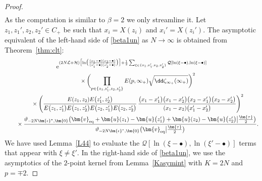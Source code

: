 \documentclass[pdftex]{sigma}
\numberwithin{equation}{section}
\begin{document}
\begin{proof}
\begin{gather}
 \end{gather}
 As the computation is similar to $\beta = 2$ we only streamline it. Let $z_1,z_1',z_2,z_2' \in C_+$ be such that $x_i = X(z_i)$ and $x_i' = X(z_i')$. The asymptotic equivalent
 of the left-hand side of \eqref{beta1un} as $N \rightarrow \infty$ is obtained from Theorem~\ref{thm:clt}:
\begin{gather}
	{\rm e}^{(2N\mathcal{L} + \mathcal{H})\bigl[\ln\bigl(\frac{(x_1- \bullet)(x_2- \bullet)}{(x_1'- \bullet)(x_2'- \bullet)}\bigr)\bigr] + \frac{1}{2}\sum_{\xi \in \{x_1,x_1',x_2,x_2'\}} \mathcal{Q}[\ln(\xi - \bullet),\ln(\xi - \bullet)]} \nonumber\\
\qquad{}	 \times \biggl(\prod_{p \in \{z_1,z'_1,z_2,z_2'\}} E(p,\infty_+)\sqrt{\dd \zeta_{\infty_+}(\infty_+)}\biggr)^2 \nonumber \\
\qquad{}	 \times \Biggl(\frac{E(z_1,z_2)E\bigl(z'_1,z_2'\bigr)}{E\bigl(z_1,z_1'\bigr)E\bigl(z_1,z_2'\bigr)E\bigl(z_2,z'_1\bigr)E\bigl(z_2,z_2'\bigr)}\,\frac{\bigl(x_1 - x_1'\bigr)\bigl(x_1 - x_2'\bigr)\bigl(x_2 - x_1'\bigr)\bigl(x_2 - x_2'\bigr)}{(x_1 - x_2)\bigl(x_1' - x_2'\bigr)}\Biggr)^2 \nonumber\\
\qquad{}	 \times \frac{\vartheta_{-2N\bm{\epsilon}^*,\bm{0}}\bigl(\bm{v}_{{\rm eq}} + \bm{u}(z_1) - \bm{u}\bigl(z'_1\bigr) + \bm{u}(z_2) - \bm{u}\bigl(z'_2\bigr)\big|\frac{\bm{\tau}}{2}\bigr)}{\vartheta_{-2N\bm{\epsilon}^*,\bm{0}}\bigl(\bm{v}_{{\rm eq}}\big|\frac{\bm{\tau}}{2}\bigr)}.\label{firstune}
\end{gather}
We have used Lemma~\ref{L44} to evaluate the $\mathcal{Q}[\ln(\xi - \bullet),\ln(\xi' - \bullet)]$ terms that appear with $\xi \neq \xi'$. In the right-hand side of \eqref{beta1un}, we use the asymptotics of the $2$-point kernel from Lemma~\ref{Kasymint} with $K = 2N$ and $p = \mp 2$.




\end{proof}
\end{document}
